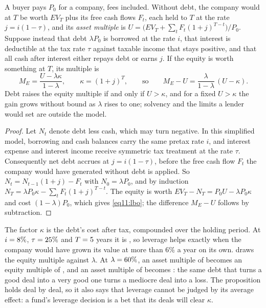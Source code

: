 \begin{chapterrefs}
\begin{proposition}\label{prop11:lbo}
A buyer pays $P_0$ for a company, fees included. Without debt, the company would at $T$ be worth
$\mathit{EV}_T$ plus its free cash flows $F_t$, each held to $T$ at the rate $j=i(1-\tau)$, and its
\emph{asset multiple} is $U=\bigl(\mathit{EV}_T+\sum_tF_t(1+j)^{T-t}\bigr)/P_0$. Suppose instead that debt
$\lambda P_0$ is borrowed at the rate $i$, that interest is deductible at the tax rate $\tau$ against
taxable income that stays positive, and that all cash after interest either repays debt or earns $j$.
If the equity is worth something at $T$, its multiple is
\begin{equation}\label{eq11:lbo}
  M_E=\frac{U-\lambda \kappa }{1-\lambda},\qquad \kappa=(1+j)^T,\qquad\text{so}\qquad
  M_E-U=\frac{\lambda}{1-\lambda}\,(U-\kappa).
\end{equation}
Debt raises the equity multiple if and only if $U>\kappa$, and for a fixed $U>\kappa$ the gain grows without bound
as $\lambda$ rises to one; solvency and the limits a lender would set are outside the model.
\end{proposition}

\begin{proof}
Let $N_t$ denote debt less cash, which may turn negative. In this simplified model, borrowing and
cash balances carry the same pretax rate $i$, and interest expense and interest income receive symmetric
tax treatment at the rate $\tau$. Consequently net debt accrues at $j=i(1-\tau)$, before the free cash
flow $F_t$ the company would have generated without debt is applied. So $N_t=N_{t-1}(1+j)-F_t$ with $N_0=\lambda P_0$, and by induction
$N_T=\lambda P_0\kappa-\sum_tF_t(1+j)^{T-t}$. The equity is worth $\mathit{EV}_T-N_T=P_0U-\lambda P_0\kappa$ and cost
$(1-\lambda)P_0$, which gives \cref{eq11:lbo}; the difference $M_E-U$ follows by subtraction.
\end{proof}

The factor $\kappa$ is the debt's cost after tax, compounded over the holding period. At $i=8\%$,
$\tau=25\%$ and $T=5$ years it is \lxK, so leverage helps exactly when the company would have
grown its value at more than 6\% a year on its own.  draws the equity multiple
against $\lambda$. At $\lambda=60\%$, an asset multiple of \lxUHi{} becomes an equity multiple of
\lxMHi, and an asset multiple of \lxULo{} becomes \lxMLo: the same debt that turns a good deal into a
very good one turns a mediocre deal into a loss. The proposition holds deal by deal, so it also says
that leverage cannot be judged by its average effect: a fund's leverage decision is a bet that its
deals will clear $\kappa$.


\end{chapterrefs}
